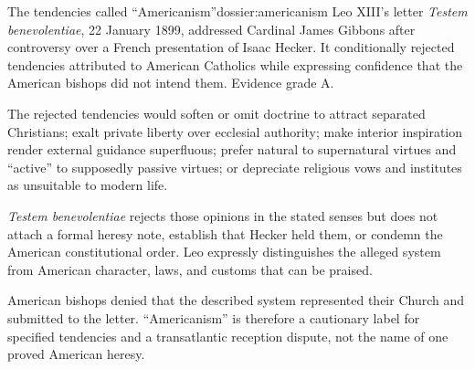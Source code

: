 \begin{heresydossier}{The tendencies called ``Americanism''}{dossier:americanism}
\objectfield Leo XIII's letter \emph{Testem benevolentiae}, 22 January 1899, addressed Cardinal James Gibbons after controversy over a French presentation of Isaac Hecker. It conditionally rejected tendencies attributed to American Catholics while expressing confidence that the American bishops did not intend them. Evidence grade A.

\propositionfield The rejected tendencies would soften or omit doctrine to attract separated Christians; exalt private liberty over ecclesial authority; make interior inspiration render external guidance superfluous; prefer natural to supernatural virtues and ``active'' to supposedly passive virtues; or depreciate religious vows and institutes as unsuitable to modern life.

\responsefield \emph{Testem benevolentiae} rejects those opinions in the stated senses but does not attach a formal heresy note, establish that Hecker held them, or condemn the American constitutional order. Leo expressly distinguishes the alleged system from American character, laws, and customs that can be praised.

\aftermathfield American bishops denied that the described system represented their Church and submitted to the letter. ``Americanism'' is therefore a cautionary label for specified tendencies and a transatlantic reception dispute, not the name of one proved American heresy.
\end{heresydossier}

